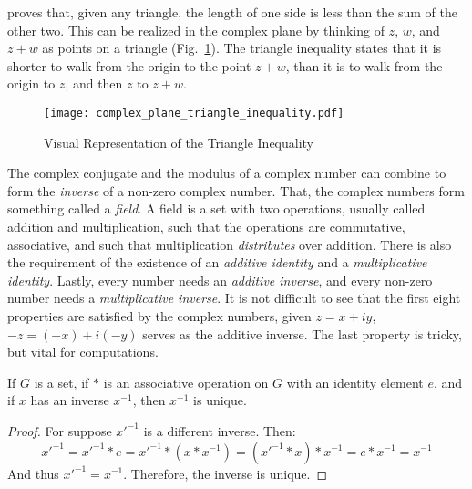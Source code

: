     proves that, given any triangle, the length of one side is less
    than the sum of the other two. This can be realized in the
    complex plane by thinking of $z$, $w$, and $z+w$ as points on a
    triangle (Fig.~\ref{fig:Triangle_Inequality}). The triangle inequality
    states that it is shorter to walk from the origin to the point $z+w$,
    than it is to walk from the origin to $z$, and then $z$ to $z+w$.
    \begin{figure}[H]
        \centering
        \captionsetup{type=figure}
        \texttt{[image: complex\_plane\_triangle\_inequality.pdf]}
        \caption{Visual Representation of the Triangle Inequality}
        \label{fig:Triangle_Inequality}
    \end{figure}
    The complex conjugate and the modulus of a complex number can
    combine to form the \textit{inverse} of a non-zero complex number.
    That, the complex numbers form something called a \textit{field}. A
    field is a set with two operations, usually called addition
    and multiplication, such that the operations are commutative,
    associative, and such that multiplication \textit{distributes}
    over addition. There is also the requirement of the existence of an
    \textit{additive identity} and a \textit{multiplicative identity}.
    Lastly, every number needs an \textit{additive inverse}, and every
    non-zero number needs a \textit{multiplicative inverse}. It is not
    difficult to see that the first eight properties are satisfied by
    the complex numbers, given $z=x+iy$,
    $\minus{z}=(\minus{x})+i(\minus{y})$ serves as the additive inverse.
    The last property is tricky, but vital for computations.
    \begin{theorem}
        \label{thm:Inverses_Are_Unique_In_Group}%
        If $G$ is a set, if $*$ is an associative operation on $G$ with an
        identity element $e$, and if $x$ has an inverse $x^{\minus{1}}$,
        then $x^{\minus{1}}$ is unique.
    \end{theorem}
    \begin{proof}
        For suppose $x'^{\minus{1}}$ is a different inverse. Then:
        \begin{equation}
            x'^{\minus{1}}=x'^{\minus{1}}*e
                          =x'^{\minus{1}}*(x*x^{\minus{1}})
                          =(x'^{\minus{1}}*x)*x^{\minus{1}}
                          =e*x^{\minus{1}}
                          =x^{\minus{1}}
        \end{equation}
        And thus $x'^{\minus{1}}=x^{\minus{1}}$. Therefore,
        the inverse is unique.
    \end{proof}
